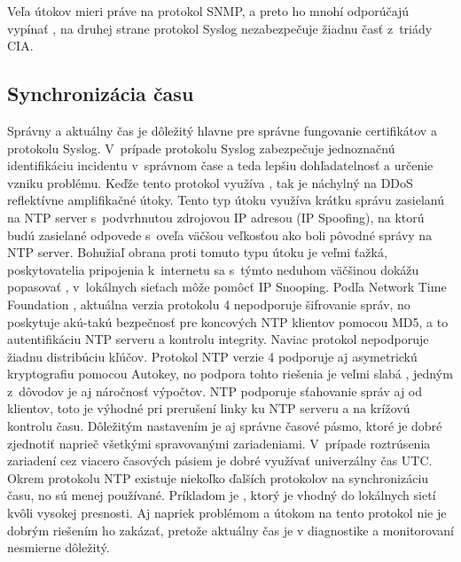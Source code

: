 Veľa útokov mieri práve na protokol SNMP, a preto ho mnohí odporúčajú vypínať \cite{CIS_DrTLsgXv24lxeIIM}, na druhej strane protokol Syslog nezabezpečuje žiadnu časť z~triády CIA.   


\subsection{Synchronizácia času}
Správny a aktuálny čas je dôležitý hlavne pre správne fungovanie certifikátov a protokolu Syslog. V~prípade protokolu Syslog zabezpečuje jednoznačnú identifikáciu incidentu v~správnom čase a teda lepšiu dohľadatelnosť a určenie vzniku problému. Keďže tento protokol využíva , tak je náchylný na DDoS reflektívne amplifikačné útoky. Tento typ útoku využíva krátku správu zasielanú na NTP server s~podvrhnutou zdrojovou IP adresou (IP Spoofing), na ktorú budú zasielané odpovede s~oveľa väčšou veľkosťou ako boli pôvodné správy na NTP server. Bohužiaľ obrana proti tomuto typu útoku je veľmi ťažká, poskytovatelia pripojenia k~internetu sa s~týmto neduhom väčšinou dokážu popasovať \cite{gTkmbyKon9H6tuAm}, v~lokálnych sieťach môže pomôcť IP Snooping. Podľa Network Time Foundation \cite{s0goWNnWp5OjqREE}, aktuálna verzia protokolu 4 nepodporuje šifrovanie správ, no poskytuje akú-takú bezpečnosť pre koncových NTP klientov pomocou MD5, a to autentifikáciu NTP serveru a kontrolu integrity. Naviac protokol nepodporuje žiadnu distribúciu kľúčov. Protokol NTP verzie 4 podporuje aj asymetrickú kryptografiu pomocou Autokey, no podpora tohto riešenia je veľmi slabá \cite{s0goWNnWp5OjqREE}, jedným z~dôvodov je aj náročnosť výpočtov. NTP podporuje sťahovanie správ aj od klientov, toto je výhodné pri prerušení linky ku NTP serveru a na krížovú kontrolu času. Dôležitým nastavením je aj správne časové pásmo, ktoré je dobré zjednotiť naprieč všetkými spravovanými zariadeniami. V~prípade roztrúsenia zariadení cez viacero časových pásiem je dobré využívať univerzálny čas UTC. Okrem protokolu NTP existuje niekoľko ďalších protokolov na synchronizáciu času, no sú menej používané. Príkladom je , ktorý je vhodný do lokálnych sietí kvôli vysokej presnosti. Aj napriek problémom a útokom na tento protokol nie je dobrým riešením ho zakázať, pretože aktuálny čas je v diagnostike a monitorovaní nesmierne dôležitý.

